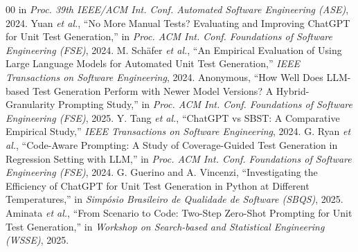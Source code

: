 \documentclass[conference]{IEEEtran}
\begin{document}
\begin{thebibliography}{00}
in \textit{Proc. 39th IEEE/ACM Int. Conf. Automated Software Engineering (ASE)}, 2024.
Yuan \textit{et al.},
``No More Manual Tests? Evaluating and Improving ChatGPT for Unit Test Generation,''
in \textit{Proc. ACM Int. Conf. Foundations of Software Engineering (FSE)}, 2024.
M. Sch\"afer \textit{et al.},
``An Empirical Evaluation of Using Large Language Models for Automated Unit Test Generation,''
\textit{IEEE Transactions on Software Engineering}, 2024.
Anonymous,
``How Well Does LLM-based Test Generation Perform with Newer Model Versions? A Hybrid-Granularity Prompting Study,''
in \textit{Proc. ACM Int. Conf. Foundations of Software Engineering (FSE)}, 2025.
Y. Tang \textit{et al.},
``ChatGPT vs SBST: A Comparative Empirical Study,''
\textit{IEEE Transactions on Software Engineering}, 2024.
G. Ryan \textit{et al.},
``Code-Aware Prompting: A Study of Coverage-Guided Test Generation in Regression Setting with LLM,''
in \textit{Proc. ACM Int. Conf. Foundations of Software Engineering (FSE)}, 2024.
G. Guerino and A. Vincenzi,
``Investigating the Efficiency of ChatGPT for Unit Test Generation in Python at Different Temperatures,''
in \textit{Simp\'osio Brasileiro de Qualidade de Software (SBQS)}, 2025.
Aminata \textit{et al.},
``From Scenario to Code: Two-Step Zero-Shot Prompting for Unit Test Generation,''
in \textit{Workshop on Search-based and Statistical Engineering (WSSE)}, 2025.
\end{thebibliography}
\end{document}
